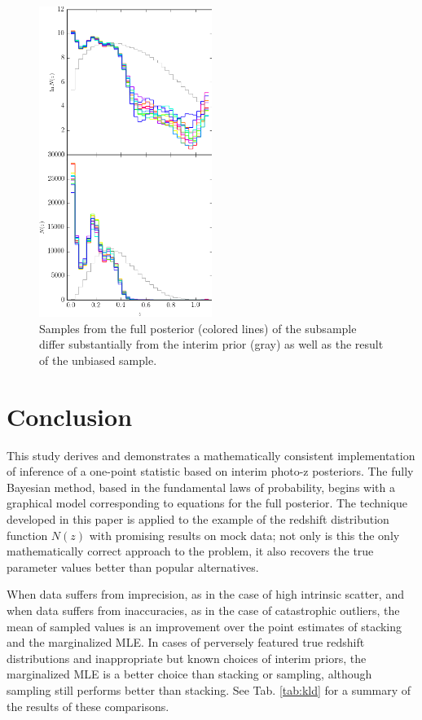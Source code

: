 \documentclass[preprint]{aastex}
\begin{document}
\begin{figure}
\includegraphics[width=0.5\textwidth]{figs/bias/samps.png}
\caption{Samples from the full posterior (colored lines) of the subsample 
differ substantially from the interim prior (gray) as well as the result of the 
unbiased sample.}
\label{fig:biasparam}
\end{figure}

\clearpage
\section{Conclusion}
\label{sec:con}

This study derives and demonstrates a mathematically consistent implementation 
of inference of a one-point statistic based on interim photo-z posteriors.  The 
fully Bayesian method, based in the fundamental laws of probability, begins 
with a graphical model corresponding to equations for the full posterior.  The 
technique developed in this paper is applied to the example of the redshift 
distribution function $N(z)$ with promising results on mock data; not only is 
this the only mathematically correct approach to the problem, it also recovers 
the true parameter values better than popular alternatives.  

When data suffers from imprecision, as in the case of high intrinsic scatter, 
and when data suffers from inaccuracies, as in the case of catastrophic 
outliers, the mean of sampled values is an improvement over the point estimates 
of stacking and the marginalized MLE.  In cases of perversely featured true 
redshift distributions and inappropriate but known choices of interim priors, 
the marginalized MLE is a better choice than stacking or sampling, although 
sampling still performs better than stacking.  See Tab. \ref{tab:kld} for a 
summary of the results of these comparisons.
\end{document}
